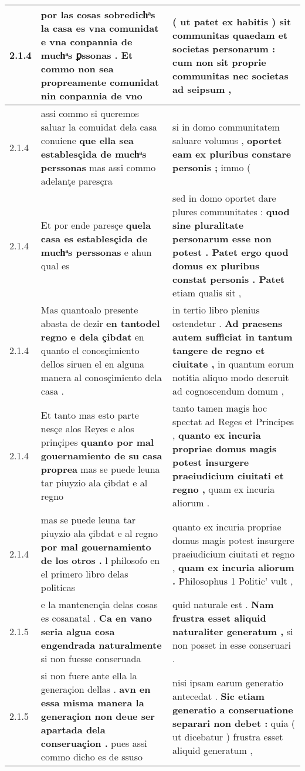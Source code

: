 \begin{tabular}{|p{1cm}|p{6.5cm}|p{6.5cm}|}
2.1.4 & por las cosas sobredichͣs la casa es vna comunidat \textbf{ e vna conpannia de muchͣs ꝑssonas . } Et commo non sea propreamente comunidat nin conpannia de vno & ( ut patet ex habitis ) \textbf{ sit communitas quaedam et societas personarum : } cum non sit proprie communitas nec societas ad seipsum , \\\hline
2.1.4 & assi commo si queremos saluar la comuidat dela casa conuiene \textbf{ que ella sea establesçida de muchͣs perssonas } mas assi commo adelanţe paresçra & si in domo communitatem saluare volumus , \textbf{ oportet eam ex pluribus constare personis ; } immo ( \\\hline
2.1.4 & Et por ende paresçe \textbf{ quela casa es establesçida de muchͣs perssonas } e ahun qual es & sed in domo oportet dare plures communitates : \textbf{ quod sine pluralitate personarum esse non potest . Patet ergo quod domus ex pluribus constat personis . Patet } etiam qualis sit , \\\hline
2.1.4 & Mas quantoalo presente abasta de dezir \textbf{ en tantodel regno e dela çibdat } en quanto el conosçimiento dellos siruen el en alguna manera al conosçimiento dela casa . & in tertio libro plenius ostendetur . \textbf{ Ad praesens autem sufficiat in tantum tangere de regno et ciuitate , } in quantum eorum notitia aliquo modo deseruit ad cognoscendum domum , \\\hline
2.1.4 & Et tanto mas esto parte nesçe alos Reyes e alos prinçipes \textbf{ quanto por mal gouernamiento de su casa proprea } mas se puede leuna tar piuyzio ala çibdat e al regno & tanto tamen magis hoc spectat ad Reges et Principes , \textbf{ quanto ex incuria propriae domus magis potest insurgere praeiudicium ciuitati et regno , } quam ex incuria aliorum . \\\hline
2.1.4 & mas se puede leuna tar piuyzio ala çibdat e al regno \textbf{ por mal gouernamiento de los otros . } l philosofo en el primero libro delas politicas & quanto ex incuria propriae domus magis potest insurgere praeiudicium ciuitati et regno , \textbf{ quam ex incuria aliorum . } Philosophus 1 Politic’ vult , \\\hline
2.1.5 & e la mantenençia delas cosas es cosanatal . \textbf{ Ca en vano seria algua cosa engendrada naturalmente } si non fuesse conseruada & quid naturale est . \textbf{ Nam frustra esset aliquid naturaliter generatum , } si non posset in esse conseruari . \\\hline
2.1.5 & si non fuere ante ella la generaçion dellas . \textbf{ avn en essa misma manera la generaçion non deue ser apartada dela conseruaçion . } pues assi commo dicho es de ssuso & nisi ipsam earum generatio antecedat . \textbf{ Sic etiam generatio a conseruatione separari non debet : } quia ( ut dicebatur ) frustra esset aliquid generatum , \\\hline

\end{tabular}
